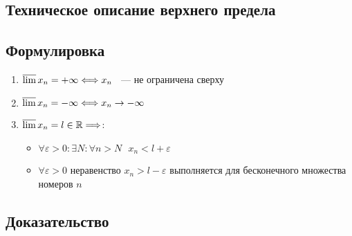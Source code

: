 \documentclass[../main.tex]{subfiles}
\begin{document}
\subsection{Техническое описание верхнего предела}
 \subsection*{Формулировка}
        
            \begin{enumerate}
            
                \item $\varlimsup x_n = +\infty \Longleftrightarrow x_n$ ~--- не ограничена сверху
                
                \item $\varlimsup x_n = -\infty \Longleftrightarrow x_n \rightarrow -\infty$
                
                \item $\varlimsup x_n = l \in \mathbb{R} \Longrightarrow$:
                
                \begin{itemize}
                
                    \item $\forall \varepsilon > 0 : \exists N: \forall n > N \ \ \ x_n < l + \varepsilon$
                    
                    \item $\forall \varepsilon > 0$ неравенство $x_n > l - \varepsilon$ выполняется для бесконечного множества номеров $n$
                
                \end{itemize}
                
            \end{enumerate}
            
        \subsection*{Доказательство}
        
\end{document}
